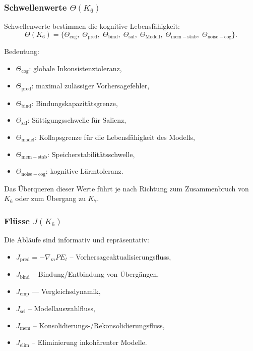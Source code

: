 \subsubsection{Schwellenwerte \texorpdfstring{$\Theta(K_6)$}{\Theta(K_6)}}

Schwellenwerte bestimmen die kognitive Lebensfähigkeit:
\[
\Theta(K_6)=
\{
\Theta_{\mathrm{cog}},\;
\Theta_{\mathrm{pred}},\;
\Theta_{\mathrm{bind}},\;
\Theta_{\mathrm{sal}},\;
\Theta_{\mathrm{Modell}},\;
\Theta_{\mathrm{mem-stab}},\;
\Theta_{\mathrm{noise-cog}}
\}.
\]

Bedeutung:
\begin{itemize}
    \item $\Theta_{\mathrm{cog}}$: globale Inkonsistenztoleranz,
    \item $\Theta_{\mathrm{pred}}$: maximal zulässiger Vorhersagefehler,
    \item $\Theta_{\mathrm{bind}}$: Bindungskapazitätsgrenze,
    \item $\Theta_{\mathrm{sal}}$: Sättigungsschwelle für Salienz,
    \item $\Theta_{\mathrm{model}}$: Kollapsgrenze für die Lebensfähigkeit des Modells,
    \item $\Theta_{\mathrm{mem-stab}}$: Speicherstabilitätsschwelle,
    \item $\Theta_{\mathrm{noise-cog}}$: kognitive Lärmtoleranz.
\end{itemize}

Das Überqueren dieser Werte führt je nach Richtung zum Zusammenbruch von $K_6$ oder zum Übergang zu $K_7$.

\subsubsection{Flüsse \texorpdfstring{$J(K_6)$}{J(K_6)}}

Die Abläufe sind informativ und repräsentativ:

\begin{itemize}
    \item $J_{\mathrm{pred}} = -\nabla_m PE_t$ – Vorhersageaktualisierungsfluss,
    \item $J_{\mathrm{bind}}$ – Bindung/Entbindung von Übergängen,
    \item $J_{\mathrm{cmp}}$ — Vergleichsdynamik,
    \item $J_{\mathrm{sel}}$ – Modellauswahlfluss,
    \item $J_{\mathrm{mem}}$ – Konsolidierungs-/Rekonsolidierungsfluss,
    \item $J_{\mathrm{elim}}$ – Eliminierung inkohärenter Modelle.
\end{itemize}

